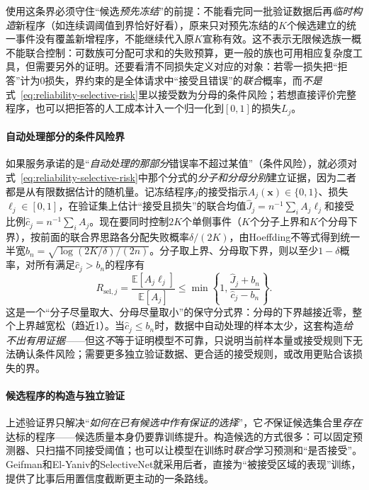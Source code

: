使用这条界必须守住“候选\emph{预先冻结}”的前提：不能看完同一批验证数据后再\emph{临时构造}新程序（如连续调阈值到界恰好好看），原来只对预先冻结的$K$个候选建立的统一事件没有覆盖新增程序，不能继续代入原$K$宣称有效。这不表示无限候选族一概不能联合控制：可数族可分配可求和的失败预算，更一般的族也可用相应复杂度工具，但需要另外的证明。还要看清不同损失定义对应的对象：若零一损失把“拒答”计为0损失，界约束的是全体请求中“接受且错误”的\emph{联合}概率，而\emph{不是}式~\eqref{eq:reliability-selective-risk}里以接受数为分母的条件风险；若想直接评价完整程序，也可以把拒答的人工成本计入一个归一化到$[0,1]$的损失$L_j$。

\paragraph{自动处理部分的条件风险界}

如果服务承诺的是“\emph{自动处理的那部分}错误率不超过某值”（条件风险），就必须对式~\eqref{eq:reliability-selective-risk}中那个分式的\emph{分子和分母分别}建立证据，因为二者都是从有限数据估计的随机量。记冻结程序$j$的接受指示$A_j(\bm{x})\in\{0,1\}$、损失$\ell_j\in[0,1]$，在验证集上估计“接受且损失”的联合均值$\hat J_j=n^{-1}\sum_i A_j\ell_j$和接受比例$\hat c_j=n^{-1}\sum_i A_j$。现在要同时控制$2K$个单侧事件（$K$个分子上界和$K$个分母下界），按前面的联合界思路各分配失败概率$\delta/(2K)$，由Hoeffding不等式得到统一半宽$b_n=\sqrt{\log(2K/\delta)/(2n)}$。分子取上界、分母取下界，则以至少$1-\delta$概率，对所有满足$\hat c_j>b_n$的程序有
\begin{equation}
 R_{\mathrm{sel},j}
 =\frac{\mathbb E[A_j\ell_j]}{\mathbb E[A_j]}
 \leq\min\left\{1,\frac{\hat J_j+b_n}{\hat c_j-b_n}\right\}.
 \label{eq:reliability-conditional-risk-bound}
\end{equation}
这是一个“分子尽量取大、分母尽量取小”的保守分式界：分母的下界越接近零，整个上界越宽松（趋近1）。当$\hat c_j\leq b_n$时，数据中自动处理的样本太少，这套构造\emph{给不出有用证据}——但这\emph{不}等于证明模型不可靠，只说明当前样本量或接受规则下无法确认条件风险；需要更多独立验证数据、更合适的接受规则，或改用更贴合该损失的界。

\paragraph{候选程序的构造与独立验证}

上述验证界只解决“\emph{如何在已有候选中作有保证的选择}”，它\emph{不}保证候选集合里\emph{存在}达标的程序——候选质量本身仍要靠训练提升。构造候选的方式很多：可以固定预测器、只扫描不同接受阈值；也可以让模型在训练时\emph{联合}学习预测和“是否接受”。Geifman和El-Yaniv的SelectiveNet就采用后者，直接为“被接受区域的表现”训练，提供了比事后用置信度截断更主动的一条路线。

